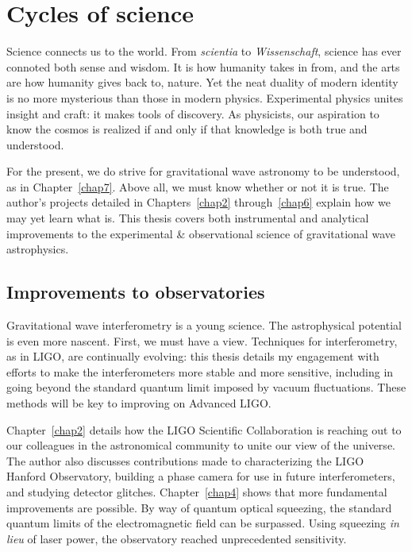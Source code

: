 


 
    \section{Cycles of science}
    \label{cycles}


Science connects us to the world. 
From \textit{scientia} to \textit{Wissenschaft}, science has ever connoted both sense and wisdom.
It is how humanity takes in from, and the arts are how humanity gives back to, nature.
Yet the neat duality of modern identity is no more mysterious than those in modern physics.
Experimental physics unites insight and craft: it makes tools of discovery.
As physicists, our aspiration to know the cosmos is realized if and only if that knowledge is both true and understood.

For the present, we do strive for gravitational wave astronomy to be understood, as in Chapter~\ref{chap7}.
Above all, we must know whether or not it is true.
The author's projects detailed in Chapters~\ref{chap2} through~\ref{chap6} explain how we may yet learn what is.
This thesis covers both instrumental and analytical improvements to the experimental \& observational science of gravitational wave astrophysics.

        \subsection{Improvements to observatories}
        \label{observatories_better}

Gravitational wave interferometry is a young science.
The astrophysical potential is even more nascent.
First, we must have a view. 
Techniques for interferometry, as in LIGO, are continually evolving: this thesis details my engagement with efforts to make the interferometers more stable and more sensitive, including in going beyond the standard quantum limit imposed by vacuum fluctuations.
These methods will be key to improving on Advanced LIGO.

Chapter~\ref{chap2} details how the LIGO Scientific Collaboration is reaching out to our colleagues in the astronomical community to unite our view of the universe.
The author also discusses contributions made to characterizing the LIGO Hanford Observatory, building a phase camera for use in future interferometers, and studying detector glitches.
Chapter~\ref{chap4} shows that more fundamental improvements are possible.
By way of quantum optical squeezing, the standard quantum limits of the electromagnetic field can be surpassed.
Using squeezing \textit{in lieu} of laser power, the observatory reached unprecedented sensitivity.

